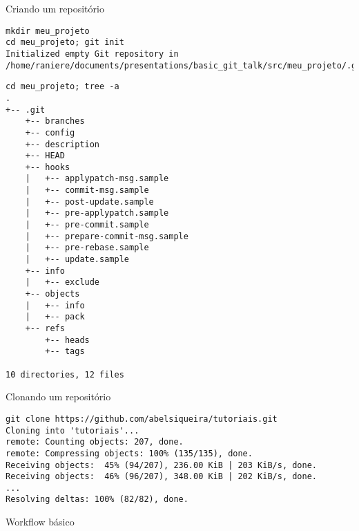 \documentclass[11pt]{beamer}
\begin{document}
\begin{frame}[fragile]{Criando um repositório}
    \begin{lstlisting}
mkdir meu_projeto
cd meu_projeto; git init
Initialized empty Git repository in /home/raniere/documents/presentations/basic_git_talk/src/meu_projeto/.git/
    \end{lstlisting}
\end{frame}

\begin{frame}[fragile]
    \begin{lstlisting}
cd meu_projeto; tree -a
.
+-- .git
    +-- branches
    +-- config
    +-- description
    +-- HEAD
    +-- hooks
    |   +-- applypatch-msg.sample
    |   +-- commit-msg.sample
    |   +-- post-update.sample
    |   +-- pre-applypatch.sample
    |   +-- pre-commit.sample
    |   +-- prepare-commit-msg.sample
    |   +-- pre-rebase.sample
    |   +-- update.sample
    +-- info
    |   +-- exclude
    +-- objects
    |   +-- info
    |   +-- pack
    +-- refs
        +-- heads
        +-- tags

10 directories, 12 files
    \end{lstlisting}
\end{frame}

\begin{frame}[fragile]{Clonando um repositório}
    \begin{lstlisting}
git clone https://github.com/abelsiqueira/tutoriais.git
Cloning into 'tutoriais'...
remote: Counting objects: 207, done.
remote: Compressing objects: 100% (135/135), done.
Receiving objects:  45% (94/207), 236.00 KiB | 203 KiB/s, done.
Receiving objects:  46% (96/207), 348.00 KiB | 202 KiB/s, done.
...
Resolving deltas: 100% (82/82), done.
    \end{lstlisting}
\end{frame}

\begin{frame}{Workflow básico}
    \begin{center}
    \end{center}
\end{frame}
\end{document}
